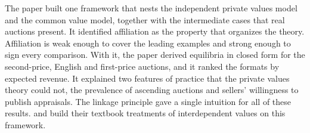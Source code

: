  The paper built one framework that nests the independent private values model and the
common value model, together with the intermediate cases that real auctions present. It identified affiliation
as the property that organizes the theory. Affiliation is weak enough to cover the leading examples and strong
enough to sign every comparison. With it, the paper derived equilibria in closed form for the second-price,
English and first-price auctions, and it ranked the formats by expected revenue. It explained two features of
practice that the private values theory could not, the prevalence of ascending auctions and sellers'
willingness to publish appraisals. The linkage principle gave a single intuition for all of these results.
\citet{Krishna2010} and \citet{Milgrom2004} build their textbook treatments of interdependent values on this
framework.

